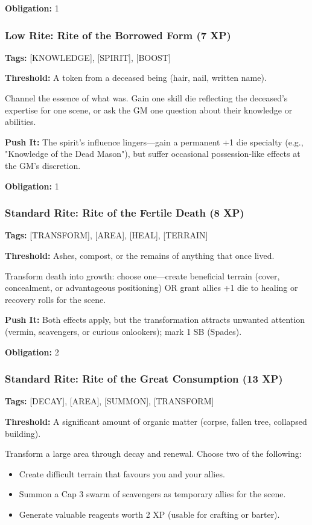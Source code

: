 \textbf{Obligation:} 1

\subsubsection{Low Rite: Rite of the Borrowed Form (7 XP)}

\textbf{Tags:} [KNOWLEDGE], [SPIRIT], [BOOST]

\textbf{Threshold:} A token from a deceased being (hair, nail, written name).

Channel the essence of what was. Gain one skill die reflecting the deceased's expertise for one scene, or ask the GM one question about their knowledge or abilities.

\textbf{Push It:} The spirit's influence lingers—gain a permanent +1 die specialty (e.g., "Knowledge of the Dead Mason"), but suffer occasional possession-like effects at the GM's discretion.

\textbf{Obligation:} 1

\subsubsection{Standard Rite: Rite of the Fertile Death (8 XP)}

\textbf{Tags:} [TRANSFORM], [AREA], [HEAL], [TERRAIN]

\textbf{Threshold:} Ashes, compost, or the remains of anything that once lived.

Transform death into growth: choose one—create beneficial terrain (cover, concealment, or advantageous positioning) OR grant allies +1 die to healing or recovery rolls for the scene.

\textbf{Push It:} Both effects apply, but the transformation attracts unwanted attention (vermin, scavengers, or curious onlookers); mark 1 SB (Spades).

\textbf{Obligation:} 2

\subsubsection{Standard Rite: Rite of the Great Consumption (13 XP)}

\textbf{Tags:} [DECAY], [AREA], [SUMMON], [TRANSFORM]

\textbf{Threshold:} A significant amount of organic matter (corpse, fallen tree, collapsed building).

Transform a large area through decay and renewal. Choose two of the following:
\begin{itemize}
\item Create difficult terrain that favours you and your allies.
\item Summon a Cap 3 swarm of scavengers as temporary allies for the scene.
\item Generate valuable reagents worth 2 XP (usable for crafting or barter).
\end{itemize}

